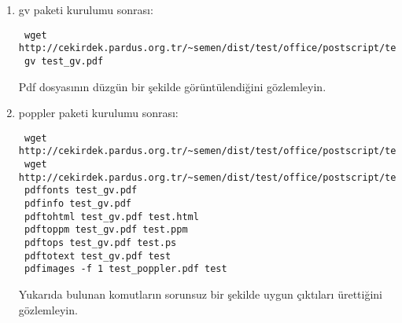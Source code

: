 \documentclass[a4paper,10pt]{article}
\begin{document}
\begin{enumerate}
\item gv paketi kurulumu sonrası:
\begin{verbatim}
 wget http://cekirdek.pardus.org.tr/~semen/dist/test/office/postscript/test_gv.pdf
 gv test_gv.pdf
\end{verbatim}

Pdf dosyasının düzgün bir şekilde görüntülendiğini gözlemleyin.

\item poppler paketi kurulumu sonrası:
\begin{verbatim}
 wget http://cekirdek.pardus.org.tr/~semen/dist/test/office/postscript/test_gv.pdf
 wget http://cekirdek.pardus.org.tr/~semen/dist/test/office/postscript/test_poppler.pdf
 pdffonts test_gv.pdf
 pdfinfo test_gv.pdf
 pdftohtml test_gv.pdf test.html
 pdftoppm test_gv.pdf test.ppm
 pdftops test_gv.pdf test.ps
 pdftotext test_gv.pdf test
 pdfimages -f 1 test_poppler.pdf test
\end{verbatim}

Yukarıda bulunan komutların sorunsuz bir şekilde uygun çıktıları ürettiğini gözlemleyin.
\end{enumerate}
\end{document}
